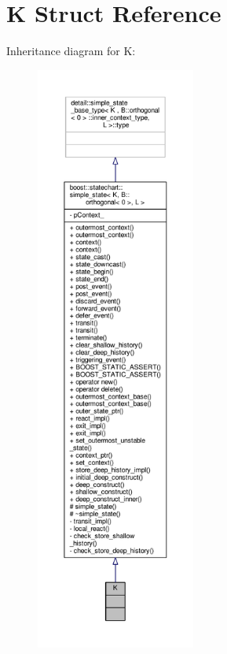 \hypertarget{struct_k}{}\section{K Struct Reference}
\label{struct_k}


Inheritance diagram for K\+:
\nopagebreak
\begin{figure}[H]
\begin{center}
\leavevmode
\includegraphics[height=550pt]{struct_k__inherit__graph}
\end{center}
\end{figure}



